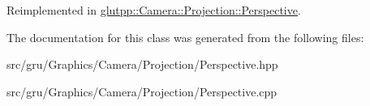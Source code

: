 \-Reimplemented in \hyperlink{classglutpp_1_1Camera_1_1Projection_1_1Perspective_a74771031b253ee639dff1a15e6b9c32d}{glutpp\-::\-Camera\-::\-Projection\-::\-Perspective}.



\-The documentation for this class was generated from the following files\-:\begin{DoxyCompactItemize}
\item 
src/gru/\-Graphics/\-Camera/\-Projection/\-Perspective.\-hpp\item 
src/gru/\-Graphics/\-Camera/\-Projection/\-Perspective.\-cpp\end{DoxyCompactItemize}
